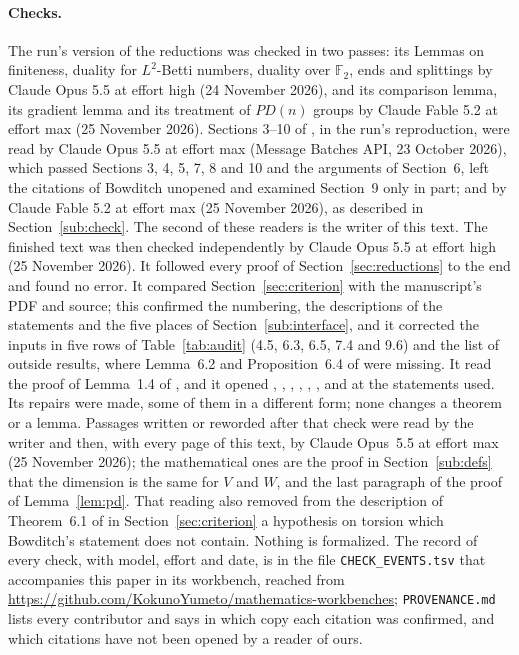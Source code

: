 \documentclass[11pt,a4paper]{article}
\theoremstyle{definition}
\theoremstyle{remark}
\newcommand{\F}{\mathbb{F}}
\begin{document}
\paragraph{Checks.} The run's version of the reductions was checked in two
passes: its Lemmas on finiteness, duality for $L^2$-Betti numbers, duality over
$\F_2$, ends and splittings by Claude Opus 5.5 at effort high (24 November 2026),
and its comparison lemma, its gradient lemma and its treatment of $PD(n)$ groups
by Claude Fable 5.2 at effort max (25 November 2026). Sections 3--10 of \cite{O},
in the run's reproduction, were read by Claude Opus 5.5 at effort max (Message
Batches API, 23 October 2026), which passed Sections 3, 4, 5, 7, 8 and 10
and the arguments of Section~6, left the citations of Bowditch unopened and
examined Section~9 only in part; and by Claude
Fable 5.2 at effort max (25 November 2026), as described in
Section~\ref{sub:check}. The second of these readers is the writer of this text.
The finished text was then checked independently by Claude Opus 5.5 at effort
high (25 November 2026). It followed every proof of
Section~\ref{sec:reductions} to the end and found no error. It compared
Section~\ref{sec:criterion} with the manuscript's PDF and source; this
confirmed the numbering, the descriptions of the statements and the five places
of Section~\ref{sub:interface}, and it corrected the inputs in five rows of
Table~\ref{tab:audit} (4.5, 6.3, 6.5, 7.4 and 9.6) and the list of outside
results, where Lemma~6.2 and Proposition~6.4 of \cite{BoT} were missing. It read
the proof of Lemma~1.4 of \cite{BoC}, and it opened \cite{W}, \cite{LL},
\cite{DO}, \cite{Da}, \cite{DHT}, \cite{Ha}, \cite{We} and \cite{Sp} at the
statements used. Its repairs were made, some of them in a different form; none changes a theorem
or a lemma.
Passages written or reworded after that check were read by the writer and
then, with every page of this text, by Claude Opus~5.5 at effort max (25
November 2026); the mathematical ones are the proof in Section~\ref{sub:defs}
that the dimension is the same for $V$ and $W$, and the last paragraph of the
proof of Lemma~\ref{lem:pd}. That reading also removed from the description of
Theorem~6.1 of \cite{BoT} in Section~\ref{sec:criterion} a hypothesis on
torsion which Bowditch's statement does not contain. Nothing
is formalized. The record of every check, with model, effort and date, is in the
file \texttt{CHECK\_EVENTS.tsv} that accompanies this paper in its workbench,
reached from \url{https://github.com/KokunoYumeto/mathematics-workbenches};
\texttt{PROVENANCE.md} lists every contributor and says in which copy each
citation was confirmed, and which citations have not been opened by a reader of
ours.
\end{document}
